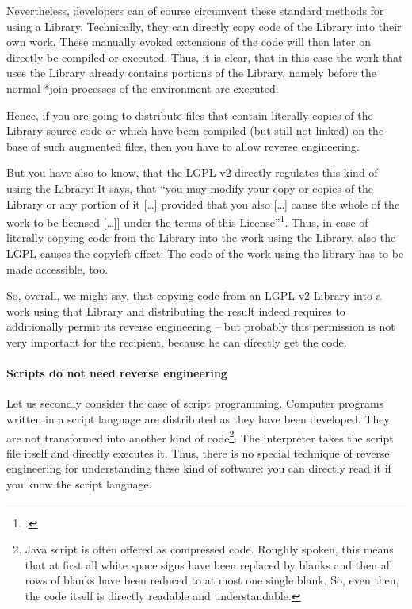 Nevertheless, developers can of course circumvent these standard methods for
using a Library. Technically, they can directly copy code of the Library into
their own work. These manually evoked extensions of the code will then later
on directly be compiled or executed. Thus, it is clear, that in this case the
work that uses the Library already contains portions of the Library, namely
before the normal *join-processes of the environment are executed.

Hence, if you are going to distribute files that contain literally copies of the
Library source code or which have been compiled (but still not linked) on the
base of such augmented files, then you have to allow reverse engineering.

But you have also to know, that the LGPL-v2 directly regulates this kind of
using the Library: It says, that \enquote{you may modify your copy or copies of
the Library or any portion of it [\ldots] provided that you also [\ldots] cause
the whole of the work to be licensed [\ldots]] under the terms of this
License}\footcite[cf.][\nopage wp.,§2, escpcially §2c]{Lgpl21OsiLicense1999a}.
Thus, in case of literally copying code from the Library into the work using the
Library, also the LGPL causes the copyleft effect: The code of the work using
the library has to be made accessible, too. 

So, overall, we might say, that copying code from an LGPL-v2 Library into a work
using that Library and distributing the result indeed requires to additionally
permit its reverse engineering -- but probably this permission is not very
important for the recipient, because he can directly get the code.

\paragraph{Scripts do not need reverse engineering}

Let us secondly consider the case of script programming. Computer programs
written in a script language are distributed as they have been developed. They
are not transformed into another kind of code\footnote{Java script is often
offered as compressed code. Roughly spoken, this means that at first all white
space signs have been replaced by blanks and then all rows of blanks have been
reduced to at most one single blank. So, even then, the code itself is directly
readable and understandable.}. The interpreter takes the script file itself and
directly executes it. Thus, there is no special technique of reverse engineering
for understanding these kind of software: you can directly read it if you know
the script language. 

